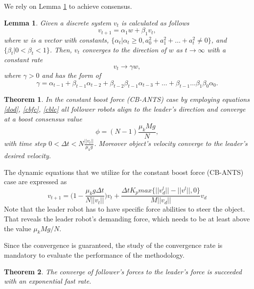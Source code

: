 \documentclass[letterpaper, 10 pt, conference]{ieeeconf}
\newtheorem{lemma}{\textbf{Lemma}}
\newtheorem{theorem}{\textbf{Theorem}}
\begin{document}
We rely on Lemma \ref{lem1} to achieve consensus. \vspace{.2cm}
\begin{lemma}\label{lem1}
\textit{Given a discrete system $v_t$ is calculated as follows
\begin{equation}
v_{t+1}=\alpha_1 w+\beta_1 v_t,
\end{equation}
where $w$ is a vector with constants, $\{ \alpha_t|\alpha_t \geq 0, a_0^2+a_1^2+\hdots +a_t^2 \neq 0 \}$, and $\{ \beta_t|0<\beta_t<1 \}$. Then, $v_t$ converges to the direction of $w$ as $t \rightarrow \infty$ with a constant rate
\begin{equation}
v_t \rightarrow \gamma w,
\end{equation}
where $\gamma >0$ and has the form of
\begin{equation}
\gamma =\alpha_{t-1} + \beta_{t-1}\alpha_{t-2}+\beta_{t-2}\beta_{t-1}\alpha_{t-3}+\hdots+\beta_{t-1}\hdots \beta_1\beta_0\alpha_0.
\end{equation}} \vspace{.2cm}
\end{lemma}
\begin{theorem}\label{thrm1}
\textit{In the constant boost force (CB-ANTS) case by employing equations \ref{dod}, \ref{cbfc}, \ref{cblc} all follower robots align to the leader's direction and converge at a boost consensus value 
\begin{equation}
\phi = (N-1)\frac{\mu_kMg}{N},
\end{equation}
with time step $0<\Delta t<N\frac{||v_t||}{\mu_kg}$. Moreover object's velocity converge to the leader's desired velocity.} \vspace{.2cm}
\end{theorem}
The dynamic equations that we utilize for the constant boost force (CB-ANTS) case are expressed as
\begin{equation}
v_{t+1}= \Bigg(1-\frac{\mu_k g \Delta t}{N||v_t||}\Bigg)v_t+ \frac{\Delta t K_pmax\{ ||v_d^l||-||v^l||,0 \}}{M ||v_d||}v_d
\end{equation}
Note that the leader robot has to have specific force abilities to steer the object. That reveals the leader robot's demanding force, which needs to be at least above the value $\mu_kMg/N$. 

Since the convergence is guaranteed, the study of the convergence rate is mandatory to evaluate the performance of the methodology.
\begin{theorem}\label{thrm2}
\textit{The converge of follower's forces to the leader's force is succeeded with an exponential fast rate.} \vspace{.2cm}
\end{theorem}
\end{document}
